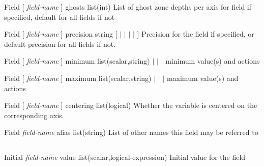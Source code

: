 \documentclass{book}
\begin{document}
\Parameter
{Field}
{[ \textit{field-name} ]} 
{ghosts}
{list(int)}
{}
{List of ghost zone depths per axis for field if specified, default for all fields if not}
{}
{}

\Parameter
{Field} 
{[ \textit{field-name} ]} 
{precision} 
{string} 
{[   
$|$  
$|$ 
$|$ 
$|$  ] } 
{Precision for the field if specified, or default precision for all fields if not.} 
{} 
{}

\Parameter
{Field}
{[ \textit{field-name} ]} 
{minimum}
{list(scalar,string)}
{ $|$  $|$  $|$ }
{minimum value(s) and actions }
{}
{}

\Parameter
{Field}
{[ \textit{field-name} ]} 
{maximum}
{list(scalar,string)}
{ $|$  $|$  $|$ }
{maximum value(s) and actions }
{}
{}

\Parameter
{Field}
{[ \textit{field-name} ]} 
{centering}
{list(logical)}
{}
{Whether the variable is centered on the corresponding axis.}
{}
{}

\Parameter
{Field}
{\textit{field-name}}
{alias}
{list(string)}
{}
{List of other names this field may be referred to}
{}
{}

\subsection{}

\Parameter
{Initial}
{\textit{field-name}}
{value}
{list(scalar,logical-expression)}
{}
{Initial value for the field}
{}
{}
\end{document}
